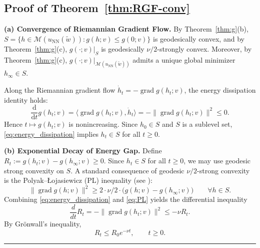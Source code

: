 \documentclass[twoside,11pt]{article}
\newcommand{\BlackBoxProof}{\rule{1.5ex}{1.5ex}}
\renewenvironment{proof}{\par\noindent{\bf Proof\ }}{\hfill\BlackBoxProof\par\medskip}
\newcommand{\ud}{\mathrm{d}}
\newcommand{\grad}{\operatorname{grad} }
\newcommand{\NN}{\mathrm{NN}}
\begin{document}
\subsection{Proof of Theorem~\ref{thm:RGF-conv}}\label{app:proof-RGF-conv}
\begin{proof}
\textbf{(a) Convergence of Riemannian Gradient Flow.}
By Theorem~\ref{thm:g}(b), $S=\{h\in\mathcal M(u_\NN(\tilde w)):  g(h;v)\le g(0;v)\}$ is geodesically convex, and by Theorem~\ref{thm:g}(c),
$g(\cdot;v)|_{S}$ is geodesically $\nu/2$-strongly convex.
Moreover, by Theorem~\ref{thm:g}(c), $g(\cdot;v)|_{\mathcal M(u_\NN(\tilde w))}$ admits a unique
global minimizer $h_\infty\in S$.

Along the Riemannian gradient flow $\dot h_t=-\grad g(h_t;v)$, the energy dissipation identity
holds:
\begin{equation}\label{eq:energy_dissipation}
\frac{\ud}{\ud t}g(h_t;v)
=\langle \grad g(h_t;v),\dot h_t\rangle
=-\|\grad g(h_t;v)\|^2 \le 0.
\end{equation}
Hence $t\mapsto g(h_t;v)$ is nonincreasing. Since $h_0\in S$ and $S$ is a sublevel set,
\eqref{eq:energy_dissipation} implies $h_t\in S$ for all $t\ge 0$.

\textbf{(b) Exponential Decay of Energy Gap.}
Define $R_t:=g(h_t;v)-g(h_\infty;v)\ge 0$.
Since $h_t\in S$ for all $t\ge 0$, we may use geodesic strong convexity on $S$.
A standard consequence of geodesic $\nu/2$-strong convexity is the Polyak--\L{}ojasiewicz (PL) inequality (see \citep[Lemma~11.28]{boumal2023intromanifolds}):
\begin{equation}\label{eq:PL}
\|\grad g(h;v)\|^2 \ge 2 \cdot \nu/2 \cdot \big(g(h;v)-g(h_\infty;v)\big) \qquad \forall h\in S.
\end{equation}
Combining \eqref{eq:energy_dissipation} and \eqref{eq:PL} yields the differential inequality
\[
\frac{d}{dt}R_t
= -\|\grad g(h_t;v)\|^2
\le -\nu R_t.
\]
By Gr\"onwall's inequality,
\begin{equation*}
R_t\le R_0 e^{-\nu t},\qquad t\ge 0.
\end{equation*}


\end{proof}
\end{document}
